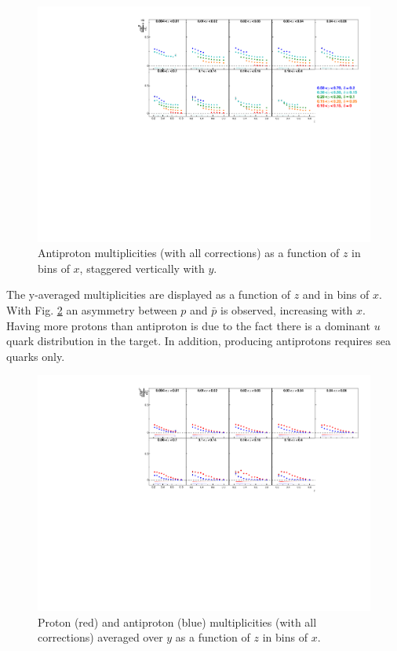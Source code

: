\begin{figure}[!h]
  \centering
	\includegraphics[scale=0.85]{./gfx/pm.pdf}
	\caption{Antiproton multiplicities (with all corrections) as a function of $z$ in bins of $x$, staggered vertically with $y$.}
	\label{pic:mpm}
\end{figure}

The y-averaged multiplicities are displayed as a function of $z$ and in bins of $x$. With Fig. \ref{pic:mpyavg} an asymmetry between $p$ and $\bar{p}$ is observed, increasing with $x$. Having more protons than antiproton is due to the fact there is a dominant $u$ quark distribution in the target. In addition, producing antiprotons requires sea quarks only.

\begin{figure}[!h]
  \centering
	\includegraphics[scale=0.85]{./gfx/pyavg.pdf}
	\caption{Proton (red) and antiproton (blue) multiplicities (with all corrections) averaged over $y$ as a function of $z$ in bins of $x$.}
	\label{pic:mpyavg}
\end{figure}

